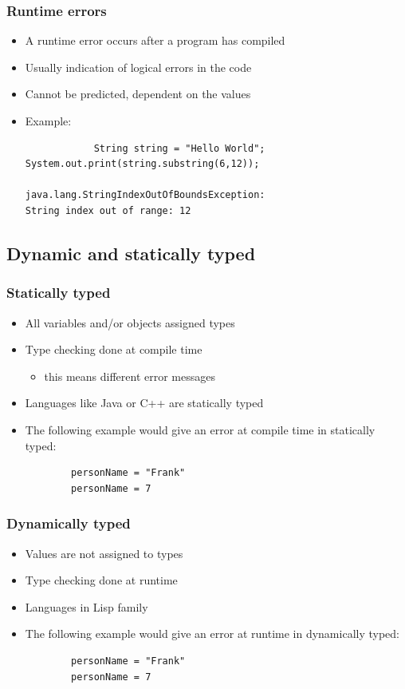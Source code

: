 \documentclass{beamer}
\begin{document}
\begin{frame}[fragile]
	\frametitle{Runtime errors}
		\begin{itemize}
			\item A runtime error occurs after a program has compiled
			\item Usually indication of logical errors in the code
			\item Cannot be predicted, dependent on the values
			\item Example:
			\begin{verbatim}
			String string = "Hello World";
System.out.print(string.substring(6,12));

java.lang.StringIndexOutOfBoundsException:
String index out of range: 12
			\end{verbatim}
		\end{itemize}
\end{frame}

\subsection{Dynamic and statically typed}

\begin{frame}[fragile]
  \frametitle{Statically typed}
	\begin{itemize}
		\item All variables and/or objects assigned types
		\item Type checking done at compile time
		\begin{itemize}
			\item this means different error messages
		\end{itemize}
		\item Languages like Java or C++ are statically typed
		\item The following example would give an error at compile time in statically typed:
		\begin{verbatim}
		personName = "Frank"
		personName = 7
		\end{verbatim}
	\end{itemize}
\end{frame}

\begin{frame}[fragile]
  \frametitle{Dynamically typed}
	\begin{itemize}
		\item Values are not assigned to types
		\item Type checking done at runtime
		\item Languages in Lisp family
		\item The following example would give an error at runtime in dynamically typed:
		\begin{verbatim}
		personName = "Frank"
		personName = 7
		\end{verbatim}
	\end{itemize}
\end{frame}
\end{document}
